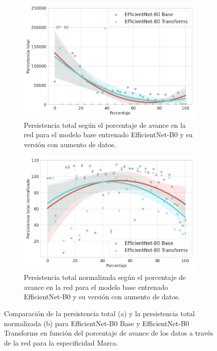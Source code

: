 \begin{figure}[H]
	\centering
	\begin{subfigure}{.5\textwidth}
		\centering
		\includegraphics[width=\linewidth]{img/m.png}
		\caption{Persistencia total según el porcentaje de avance en la red para el modelo base entrenado EfficientNet-B0 y su versión con aumento de datos.}
		\label{fig:m-homology-1}
	\end{subfigure}%
	\begin{subfigure}{.5\textwidth}
		\centering
		\includegraphics[width=\linewidth]{img/m_norm.png}
		\caption{Persistencia total normalizada según el porcentaje de avance en la red para el modelo base entrenado EfficientNet-B0 y su versión con aumento de datos.}
		\label{fig:m-homology-2}
	\end{subfigure}
	\caption{Comparación de la persistencia total (a) y la persistencia total normalizada (b) para EfficientNet-B0 Base y EfficientNet-B0 Transforms en función del porcentaje de avance de los datos a través de la red para la especificidad Marca.}
	\label{fig:m-homology}
\end{figure}

